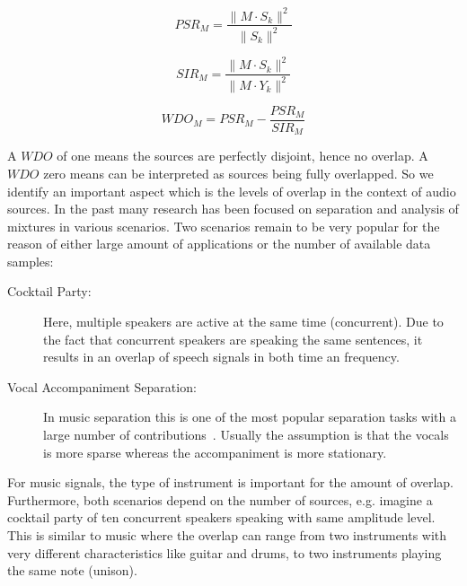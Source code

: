 \begin{equation}
    PSR_{M} = \frac{\|M \cdot S_{k}\|^{2}}{\|S_{k}\|^{2}}
\end{equation}

\begin{equation}
    SIR_{M}=\frac{\|M \cdot S_{k}\|^{2}}{\|M \cdot Y_{k}\|^{2}}
\end{equation}

\begin{equation}
    WDO_{M} = PSR_{M} - \frac{PSR_{M}}{SIR_{M}}
\end{equation}


A \(WDO\) of one means the sources are perfectly disjoint, hence no overlap.
A \(WDO\) zero means can be interpreted as sources being fully overlapped.
So we identify an important aspect which is the levels of overlap in the context of audio sources.
In the past many research has been focused on separation and analysis of mixtures in various scenarios.
Two scenarios remain to be very popular for the reason of either large amount of applications or the number of available data samples:

\begin{description}
  \item[Cocktail Party:] Here, multiple speakers are active at the same time (concurrent).
  Due to the fact that concurrent speakers are speaking the same sentences, it results in an overlap of speech signals in both time an frequency.
  \item[Vocal Accompaniment Separation:] In music separation this is one of the most popular separation tasks with a large number of contributions~\cite{rafii18}.
  Usually the assumption is that the vocals is more sparse whereas the accompaniment is more stationary.
\end{description}

For music signals, the type of instrument is important for the amount of overlap.
Furthermore, both scenarios depend on the number of sources, e.g. imagine a cocktail party of ten concurrent speakers speaking with same amplitude level.
This is similar to music where the overlap can range from two instruments with very different characteristics like guitar and drums, to two instruments playing the same note (unison).\\



